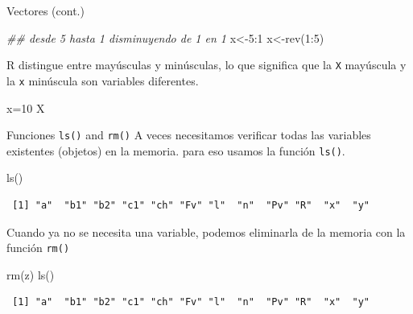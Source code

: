 \documentclass[
  ignorenonframetext,
  aspectratio=169,
  spanish,
]{beamer}
\newenvironment{Shaded}{\begin{snugshade}}{\end{snugshade}}
\newcommand{\DecValTok}[1]{\textcolor[rgb]{0.68,0.00,0.00}{#1}}
\newcommand{\DocumentationTok}[1]{\textcolor[rgb]{0.37,0.37,0.37}{\textit{#1}}}
\newcommand{\FunctionTok}[1]{\textcolor[rgb]{0.28,0.35,0.67}{#1}}
\newcommand{\NormalTok}[1]{\textcolor[rgb]{0.00,0.23,0.31}{#1}}
\newcommand{\OtherTok}[1]{\textcolor[rgb]{0.00,0.23,0.31}{#1}}
\newcommand{\SpecialCharTok}[1]{\textcolor[rgb]{0.37,0.37,0.37}{#1}}
\begin{document}
\begin{frame}[fragile]{Vectores (cont.)}
\label{vectores-cont.}
\begin{Shaded}
\begin{Highlighting}[]
\DocumentationTok{\#\# desde 5 hasta 1 disminuyendo de 1 en 1 }
\NormalTok{x}\OtherTok{\textless{}{-}}\DecValTok{5}\SpecialCharTok{:}\DecValTok{1} 
\NormalTok{x}\OtherTok{\textless{}{-}}\FunctionTok{rev}\NormalTok{(}\DecValTok{1}\SpecialCharTok{:}\DecValTok{5}\NormalTok{)  }
\end{Highlighting}
\end{Shaded}

R distingue entre mayúsculas y minúsculas, lo que significa que la
\texttt{X} mayúscula y la \texttt{x} minúscula son variables diferentes.

\begin{Shaded}
\begin{Highlighting}[]
\NormalTok{x}\OtherTok{=}\DecValTok{10}
\NormalTok{X}
\end{Highlighting}
\end{Shaded}
\end{frame}

\begin{frame}[fragile]{Funciones \texttt{ls()} and \texttt{rm()}}
\label{funciones-ls-and-rm}
A veces necesitamos verificar todas las variables existentes (objetos)
en la memoria. para eso usamos la función \texttt{ls()}.

\begin{Shaded}
\begin{Highlighting}[]
\FunctionTok{ls}\NormalTok{()}
\end{Highlighting}
\end{Shaded}

\begin{verbatim}
 [1] "a"  "b1" "b2" "c1" "ch" "Fv" "l"  "n"  "Pv" "R"  "x"  "y" 
\end{verbatim}

Cuando ya no se necesita una variable, podemos eliminarla de la memoria
con la función \texttt{rm()}

\begin{Shaded}
\begin{Highlighting}[]
\FunctionTok{rm}\NormalTok{(z)}
\FunctionTok{ls}\NormalTok{()}
\end{Highlighting}
\end{Shaded}

\begin{verbatim}
 [1] "a"  "b1" "b2" "c1" "ch" "Fv" "l"  "n"  "Pv" "R"  "x"  "y" 
\end{verbatim}
\end{frame}
\end{document}

